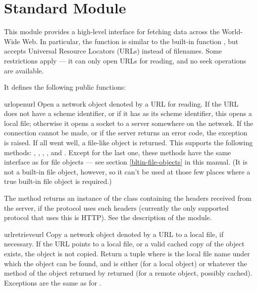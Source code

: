 \section{Standard Module }
\label{module-urllib}


This module provides a high-level interface for fetching data across
the World-Wide Web.  In particular, the  function
is similar to the built-in function , but accepts
Universal Resource Locators (URLs) instead of filenames.  Some
restrictions apply --- it can only open URLs for reading, and no seek
operations are available.

It defines the following public functions:

\begin{funcdesc}{urlopen}{url}
Open a network object denoted by a URL for reading.  If the URL does
not have a scheme identifier, or if it has  as its scheme
identifier, this opens a local file; otherwise it opens a socket to a
server somewhere on the network.  If the connection cannot be made, or
if the server returns an error code, the  exception
is raised.  If all went well, a file-like object is returned.  This
supports the following methods: , ,
, ,  and
.
Except for the last one, these methods have the same interface as for
file objects --- see section \ref{bltin-file-objects} in this
manual.  (It is not a built-in file object, however, so it can't be
used at those few places where a true built-in file object is
required.)

The  method returns an instance of the class
 containing the headers received from the
server, if the protocol uses such headers (currently the only
supported protocol that uses this is HTTP).  See the description of
the  module.
\end{funcdesc}

\begin{funcdesc}{urlretrieve}{url}
Copy a network object denoted by a URL to a local file, if necessary.
If the URL points to a local file, or a valid cached copy of the
object exists, the object is not copied.  Return a tuple
 where  is the
local file name under which the object can be found, and 
is either  (for a local object) or whatever the
 method of the object returned by 
returned (for a remote object, possibly cached).  Exceptions are the
same as for .
\end{funcdesc}

